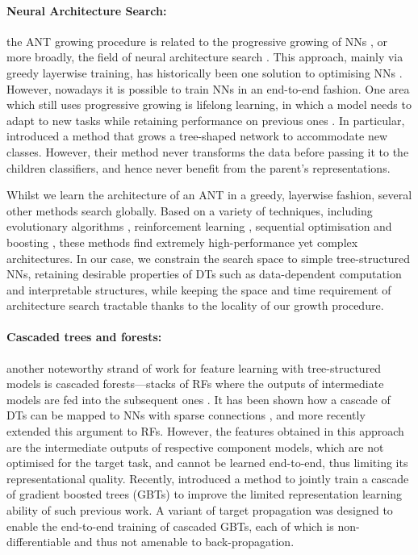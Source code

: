 \paragraph{Neural Architecture Search:} the ANT growing procedure is related to the progressive growing of NNs \cite{fahlman1990cascade,hinton2006fast,xiao2014errordriven,chen2016net2net,srivastava2015highway,lee2017lifelong,cai2018efficient,irsoy2018continuously}, or more broadly, the field of neural architecture search \cite{zoph2016neural,brock2017smash,cortes2017adanet}. This approach, mainly via greedy layerwise training, has historically been one solution to optimising NNs \cite{fahlman1990cascade,hinton2006fast}. However, nowadays it is possible to train NNs in an end-to-end fashion. One area which still uses progressive growing is lifelong learning, in which a model needs to adapt to new tasks while retaining performance on previous ones \cite{xiao2014errordriven,lee2017lifelong}. In particular, \cite{xiao2014errordriven} introduced a method that grows a tree-shaped network to accommodate new classes. However, their method never transforms the data before passing it to the children classifiers, and hence never benefit from the parent's representations. 

Whilst we learn the architecture of an ANT in a greedy, layerwise fashion, several other methods search globally. Based on a variety of techniques, including evolutionary algorithms \cite{stanley2002evolving,real2017large}, reinforcement learning \cite{zoph2016neural}, sequential optimisation \cite{liu2017progressive} and boosting \cite{cortes2017adanet}, these methods find extremely high-performance yet complex architectures. In our case, we constrain the search space to simple tree-structured NNs, retaining desirable properties of DTs such as data-dependent computation and interpretable structures, while keeping the space and time requirement of architecture search tractable thanks to the locality of our growth procedure.

\paragraph{Cascaded trees and forests:} another noteworthy strand of work for feature learning with tree-structured models is cascaded forests---stacks of RFs where the outputs of intermediate models are fed into the subsequent ones \cite{montillo2011entangled,kontschieder2013geof,zhou2017deepft}. It has been shown how a cascade of DTs can be mapped to NNs with sparse connections \cite{sethi1990entropy}, and more recently \cite{richmond2015mapping} extended this argument to RFs. However, the features obtained in this approach are the intermediate outputs of respective component models, which are not optimised for the target task, and cannot be learned end-to-end, thus limiting its representational quality. Recently, \cite{feng2018multi} introduced a method to jointly train a cascade of gradient boosted trees (GBTs) to improve the limited representation learning ability of such previous work. A variant of target propagation \cite{lee2015difference} was designed to enable the end-to-end training of cascaded GBTs, each of which is non-differentiable and thus not amenable to back-propagation. 

